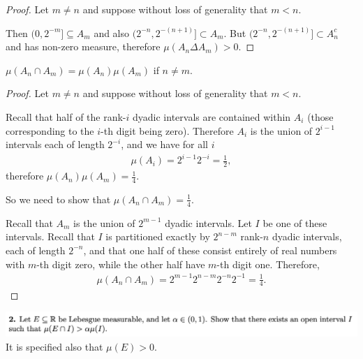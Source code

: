 \begin{proof}
  Let $m \neq n$ and suppose without loss of generality that $m < n$.

  Then $(0, 2^{-m}] \subseteq A_m$ and also $(2^{-n}, 2^{-(n+1)}] \subset A_m$.
  But $(2^{-n}, 2^{-(n+1)}] \subset A_n^c$ and has non-zero measure, therefore $\mu(A_n \Delta A_m) > 0$.
\end{proof}

\begin{claim*}
  $\mu(A_n \cap A_m) = \mu(A_n)\mu(A_m)$ if $n \neq m$.
\end{claim*}

\begin{proof}
  Let $m \neq n$ and suppose without loss of generality that $m < n$.

  Recall that half of the rank-$i$ dyadic intervals are contained within $A_i$ (those corresponding to
  the $i$-th digit being zero). Therefore $A_i$ is the union of $2^{i-1}$ intervals each of length $2^{-i}$,
  and we have for all $i$
  \begin{align*}
     \mu(A_i) = 2^{i-1}2^{-i} =\frac{1}{2},
  \end{align*}
  therefore $\mu(A_n)\mu(A_m) = \frac{1}{4}$.

  So we need to show that $\mu(A_n \cap A_m) = \frac{1}{4}$.

  Recall that $A_m$ is the union of $2^{m-1}$ dyadic intervals. Let $I$ be one of these intervals. Recall
  that $I$ is partitioned exactly by $2^{n-m}$ rank-$n$ dyadic intervals, each of length $2^{-n}$, and that one
  half of these consist entirely of real numbers with $m$-th digit zero, while the other half have $m$-th digit
  one. Therefore,
  \begin{align*}
    \mu(A_n \cap A_m) = 2^{m-1}2^{n-m}2^{-n}2^{-1} = \frac{1}{4}.
  \end{align*}
\end{proof}
\newpage
\begin{mdframed}
\includegraphics[width=400pt]{img/analysis--berkeley-202a-hw05-2e34.png}
It is specified also that $\mu(E) > 0$.
\end{mdframed}


